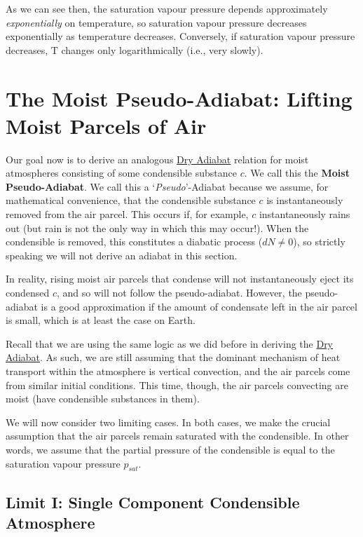As we can see then, the saturation vapour pressure depends approximately \textit{exponentially} on temperature, so saturation vapour pressure decreases exponentially as temperature decreases. Conversely, if saturation vapour pressure decreases, T changes only logarithmically (i.e., very slowly).

\section{The Moist Pseudo-Adiabat: Lifting Moist Parcels of Air}\label{Moist Pseudo Adiabat}

Our goal now is to derive an analogous \hyperref[Dry Adiabat]{Dry Adiabat} relation for moist atmospheres consisting of some condensible substance \(c\). We call this the \textbf{Moist Pseudo-Adiabat}. We call this a `\textit{Pseudo}'-Adiabat because we assume, for mathematical convenience, that the condensible substance \(c\) is instantaneously removed from the air parcel. This occurs if, for example, \(c\) instantaneously rains out (but rain is not the only way in which this may occur!). When the condensible is removed, this constitutes a diabatic process (\(dN\neq 0\)), so strictly speaking we will not derive an adiabat in this section.

In reality, rising moist air parcels that condense will not instantaneously eject its condensed \(c\), and so will not follow the pseudo-adiabat. However, the pseudo-adiabat is a good approximation if the amount of condensate left in the air parcel is small, which is at least the case on Earth.

Recall that we are using the same logic as we did before in deriving the \hyperref[Dry Adiabat]{Dry Adiabat}. As such, we are still assuming that the dominant mechanism of heat transport within the atmosphere is vertical convection, and the air parcels come from similar initial conditions. This time, though, the air parcels convecting are moist (have condensible substances in them).

We will now consider two limiting cases. In both cases, we make the crucial assumption that the air parcels remain saturated with the condensible. In other words, we assume that the partial pressure of the condensible is equal to the saturation vapour pressure \(p_{sat}\).

\subsection{Limit I: Single Component Condensible Atmosphere} 

